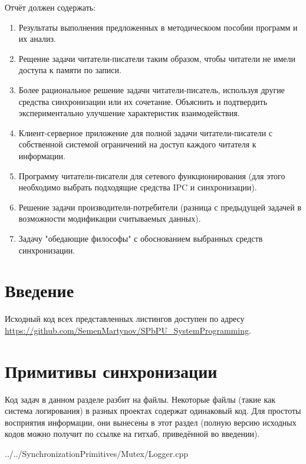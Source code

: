\documentclass[a4paper, 12pt]{article}		%
\begin{document}
Отчёт должен содержать:
\begin{enumerate}
\item Результаты выполнения предложенных в методическоом пособии программ и их анализ.
\item Рещение задачи читатели-писатели таким образом, чтобы читатели не имели доступа к памяти по записи.
\item Более рациональное решение задачи читатели-писатель, используя другие средства синхронизации или их сочетание. Объяснить и подтвердить экспериментально улучшение характеристик взаимодействия.
\item Клиент-серверное приложение для полной задачи читатели-писатели с собственной системой ограничений на доступ каждого читателя к информации.
\item Программу читатели-писатели для сетевого функционирования (для этого необходимо выбрать подходящие средства IPC и синхронизации).
\item Решение задачи производители-потребители (разница с предыдущей задачей в возможности модификации считываемых данных).
\item Задачу "обедающие философы" с обоснованием выбранных средств синхронизации.
\end{enumerate}

\newpage
\section*{Введение}

Исходный код всех представленных листингов доступен по адресу \\ \url{https://github.com/SemenMartynov/SPbPU_SystemProgramming}.

\newpage
\section{Примитивы синхронизации}

Код задач в данном разделе разбит на файлы. Некоторые файлы (такие как система логирования) в разных проектах содержат одинаковый код. Для простоты восприятия информации, они вынесены в этот раздел (полную версию исходных кодов можно получит по ссылке на гитхаб, приведённой во введении).


{../../SynchronizationPrimitives/Mutex/Logger.cpp}
\end{document}
